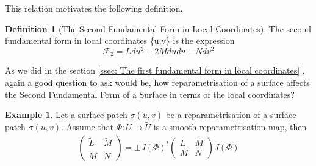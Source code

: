 \documentclass{article}
\theoremstyle{plain}
\theoremstyle{definition}
\newtheorem{definition}{Definition}
\newtheorem{example}{Example}
\theoremstyle{remark}
\begin{document}
This relation motivates the following definition.
\begin{definition}[The Second Fundamental Form in Local Coordinates]
    The second fundamental form in local coordinates \{u,v\} is the expression \[ \mathcal{F}_2 = L du^2 + 2M dudv + N dv^2\]
\end{definition}

As we did in the section \ref{ssec: The first fundamental form in local coordinates} , again a good question to ask would be, how reparametrisation of a surface affects the Second Fundamental Form of a Surface in terms of the local coordinates?

\begin{example}
    Let a surface patch \( \tilde{\sigma}(\tilde{u}, \tilde{v})\) be a reparametrisation of a surface patch \(\sigma(u,v)\). Assume that \(\Phi: U \rightarrow \tilde{U}\) is a smooth reparametrisation map, then
    \begin{align}
        \begin{pmatrix}
            \tilde{L} & \tilde{M} \\
            \tilde{M} & \tilde{N}
        \end{pmatrix}
        = \pm J(\Phi)^t
        \begin{pmatrix}
            L & M \\
            M & N
        \end{pmatrix}
        J(\Phi)
    \end{align}
\end{example}
\end{document}
